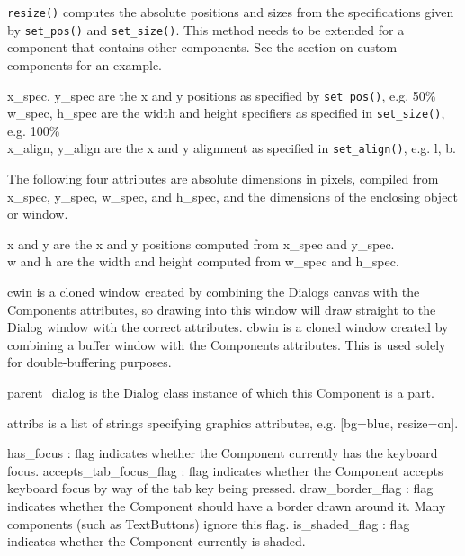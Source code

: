 
\texttt{resize()} computes the absolute positions and sizes from the
specifications given by \texttt{set\_pos()} and
\texttt{set\_size()}. This method needs
to be extended for a component that contains other components. See the
section on custom components for an example.

x\_spec, y\_spec are the x and y positions as specified by \texttt{set\_pos()},
e.g. {\textquotedbl}50\%{\textquotedbl}\\
w\_spec, h\_spec are the width and height specifiers as specified in
\texttt{set\_size()}, e.g. {\textquotedbl}100\%{\textquotedbl}\\
x\_align, y\_align are the x and y alignment as specified in
\texttt{set\_align()}, e.g. {\textquotedbl}l{\textquotedbl},
{\textquotedbl}b{\textquotedbl}.

The following four attributes are absolute dimensions in pixels,
compiled from x\_spec, y\_spec, w\_spec, and h\_spec, and the
dimensions of the enclosing object or window.

x and y are the x and y positions computed from x\_spec and
y\_spec.\\
w and h are the width and height computed from w\_spec and h\_spec.

cwin is a cloned window created by combining the
Dialog{\textquotesingle}s canvas with the Component{\textquotesingle}s
attributes, so drawing into this window will draw straight to the
Dialog window with the correct attributes. cbwin is a cloned window
created by combining a buffer window with the
Component{\textquotesingle}s attributes. This is used solely for
double-buffering purposes.

parent\_dialog is the Dialog class instance of which
this Component is a part.

attribs is a list of strings specifying graphics attributes, e.g.
[{\textquotedbl}bg=blue{\textquotedbl},
{\textquotedbl}resize=on{\textquotedbl}].

has\_focus : flag indicates whether the Component currently has the
keyboard focus. accepts\_tab\_focus\_flag : flag indicates whether the
Component accepts keyboard focus by way of the tab key being pressed.
draw\_border\_flag : flag indicates whether the Component should have a
border drawn around it. Many components (such as TextButtons) ignore
this flag. is\_shaded\_flag : flag indicates whether the Component
currently is shaded.


